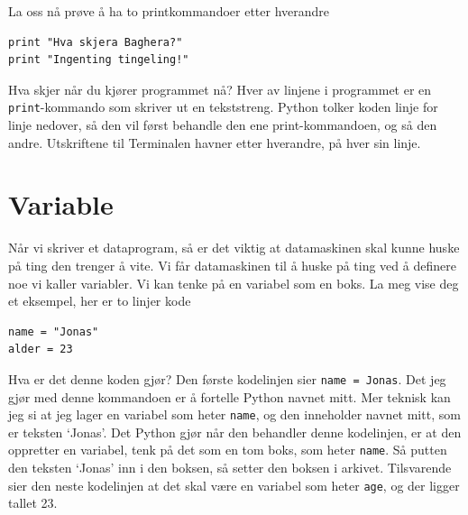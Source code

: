 \documentclass[a4paper, 11pt, notitlepage]{article}
\begin{document}
La oss nå prøve å ha to printkommandoer etter hverandre
\begin{lstlisting}
print "Hva skjera Baghera?"
print "Ingenting tingeling!"
\end{lstlisting}
Hva skjer når du kjører programmet nå? Hver av linjene i programmet er en \verb+print+-kommando som skriver ut en tekststreng. Python tolker koden linje for linje nedover, så den vil først behandle den ene print-kommandoen, og så den andre. Utskriftene til Terminalen havner etter hverandre, på hver sin linje. 

\section*{Variable}

Når vi skriver et dataprogram, så er det viktig at datamaskinen skal kunne huske på ting den trenger å vite. Vi får datamaskinen til å huske på ting ved å definere noe vi kaller variabler. Vi kan tenke på en variabel som en boks. La meg vise deg et eksempel, her er to linjer kode
\begin{lstlisting}
name = "Jonas"
alder = 23
\end{lstlisting}
Hva er det denne koden gjør? Den første kodelinjen sier \verb+name = Jonas+. Det jeg gjør med denne kommandoen er å fortelle Python navnet mitt. Mer teknisk kan jeg si at jeg lager en variabel som heter \verb+name+, og den inneholder navnet mitt, som er teksten `Jonas'. Det Python gjør når den behandler denne kodelinjen, er at den oppretter en variabel, tenk på det som en tom boks, som heter \verb+name+. Så putten den teksten `Jonas' inn i den boksen, så setter den boksen i arkivet. Tilsvarende sier den neste kodelinjen at det skal være en variabel som heter \verb+age+, og der ligger tallet 23.
\end{document}
